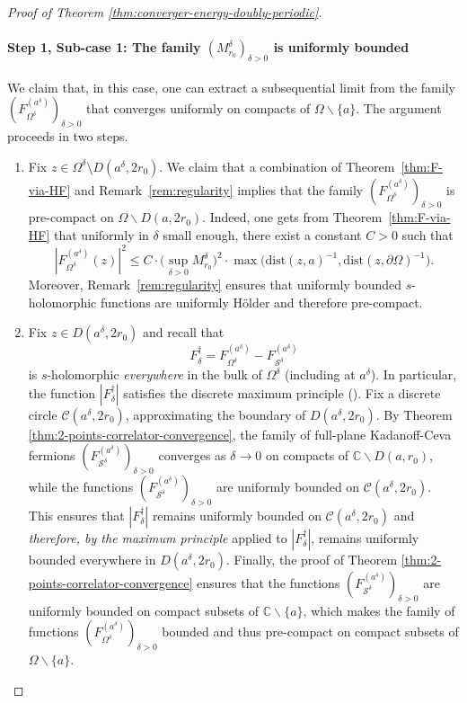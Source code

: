 \documentclass[reqno]{amsart}
\numberwithin{equation}{section}
\theoremstyle{definition}
\theoremstyle{remark}
\newcommand\cS{\mathcal{S}}
\begin{document}
\begin{proof}[Proof of Theorem \ref{thm:converger-energy-doubly-periodic}]
\paragraph{\textbf{ Step 1, Sub-case 1:  The family $(M_{r_0}^\delta)_{\delta>0}$ is uniformly bounded}}  We claim that, in this case, one can extract a subsequential limit from the family $(F^{(a^\delta)}_{\Omega^\delta})_{\delta>0}$ that converges uniformly on compacts of $\Omega \backslash \{ a \} $. The argument proceeds in two steps. 
\begin{enumerate}
	\item Fix $z\in \Omega^\delta \setminus  D(a^\delta, 2r_0)$. We claim that a combination of Theorem~\ref{thm:F-via-HF} and Remark~\ref{rem:regularity} implies that the family $(F^{(a^\delta)}_{\Omega^\delta})_{\delta>0}$ is pre-compact on $\Omega \backslash D(a,2r_0)$. Indeed, one gets from Theorem~\ref{thm:F-via-HF} that uniformly in $\delta$ small enough, there exist a constant $C>0$ such that 
\begin{equation*}
		|F^{(a^\delta)}_{\Omega^\delta}(z)|^2 \leq C\cdot  \Big(\sup_{\delta >0}M_{r_0}^{\delta}\Big)^2 \cdot  \max \Big( \textrm{dist}(z,a)^{-1}, \textrm{dist}(z,\partial\Omega)^{-1}\Big).
\end{equation*}
Moreover,  Remark~\ref{rem:regularity} ensures that uniformly bounded $s$-holomorphic functions are uniformly Hölder and therefore pre-compact. 
\item Fix $z\in D(a^\delta, 2r_0)$ and recall that 
\[
F^\dagger_\delta = F^{(a^\delta)}_{\Omega^\delta} - F^{(a^\delta)}_{\cS^\delta}
\]
is $s$-holomorphic \emph{everywhere} in the bulk of $\Omega^\delta$ (including at $a^\delta$). In particular, the function $|F^\dagger_\delta|$ satisfies the discrete maximum principle (\cite[Remark 2.9]{Che20}). Fix a discrete circle $\mathcal{C}(a^\delta,2r_0) $,  approximating the boundary of $D(a^\delta, 2r_0)$. 
By Theorem \ref{thm:2-points-correlator-convergence}, the family of full-plane Kadanoff-Ceva fermions $(F^{(a^\delta)}_{\cS^\delta})_{\delta>0}$ converges as $\delta \to 0$ on compacts of $\mathbb{C}\backslash D(a,r_0) $,  while the functions $(F^{(a^\delta)}_{\cS^\delta})_{\delta>0}$ are uniformly bounded on $\mathcal{C}(a^\delta,2r_0) $. This ensures that $|F^\dagger_\delta|$ remains uniformly bounded on $\mathcal{C}(a^\delta, 2r_0)$ and \emph{therefore, by the maximum principle} applied to $|F^\dagger_\delta|$, remains uniformly bounded everywhere in $D(a^\delta, 2r_0)$. Finally, the proof of Theorem \ref{thm:2-points-correlator-convergence} ensures that the functions $(F^{(a^\delta)}_{\cS^\delta})_{\delta>0}$ are uniformly bounded on compact subsets of $\mathbb{C} \backslash \{a\}$, which makes the family of functions $(F^{(a^\delta)}_{\Omega^\delta})_{\delta>0}$ bounded and thus pre-compact on compact subsets of $\Omega \backslash \{a\}$.
\end{enumerate}


\end{proof}
\end{document}
